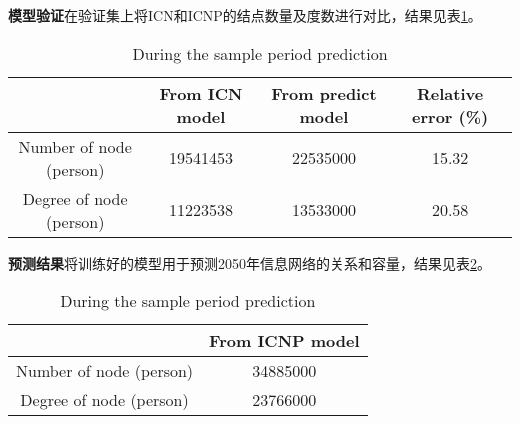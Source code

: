 \documentclass[bwprint]{cumcmthesis}
\begin{document}
\textbf{模型验证}\quad 在验证集上将ICN和ICNP的结点数量及度数进行对比，结果见表\ref{tbl:2016d1}。

\begin{table}[!h]
\begin{center}
\caption{During the sample period prediction}
\label{tbl:2016d1}
\renewcommand{\arraystretch}{0.5}
\begin{tabular}{c|ccc}
\hline
& From ICN model & From predict model & Relative error (\%)\\ \hline
Number of node (person) & 19541453 & 22535000 & 15.32\\
Degree of node (person) & 11223538 & 13533000 & 20.58\\ \hline
\end{tabular}
\end{center}
\end{table}

\textbf{预测结果}\quad 将训练好的模型用于预测2050年信息网络的关系和容量，结果见表\ref{tbl:2016d2}。

\begin{table}[!h]
\begin{center}
\caption{During the sample period prediction}
\label{tbl:2016d2}
\begin{tabular}{c|c}
\hline
& From ICNP model\\ \hline
Number of node (person) & 34885000\\
Degree of node (person) & 23766000\\ \hline
\end{tabular}
\end{center}
\end{table}

\newpage



\appendix
\end{document}
